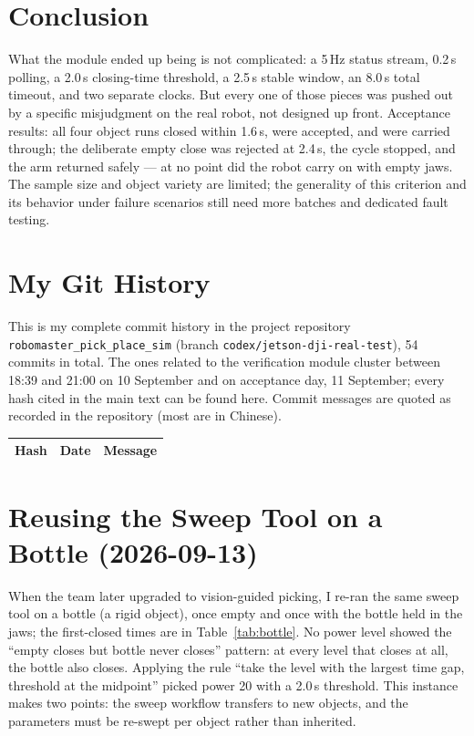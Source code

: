 \documentclass[11pt,a4paper]{ctexart}
\begin{document}
\section{Conclusion}

What the module ended up being is not complicated: a 5\,Hz status stream,
0.2\,s polling, a 2.0\,s closing-time threshold, a 2.5\,s stable window, an
8.0\,s total timeout, and two separate clocks. But every one of those pieces
was pushed out by a specific misjudgment on the real robot, not designed up
front. Acceptance results: all four object runs closed within 1.6\,s, were
accepted, and were carried through; the deliberate empty close was rejected
at 2.4\,s, the cycle stopped, and the arm returned safely --- at no point did
the robot carry on with empty jaws. The sample size and object variety are
limited; the generality of this criterion and its behavior under failure
scenarios still need more batches and dedicated fault testing.

\appendix
\section{My Git History}
This is my complete commit history in the project repository
\texttt{robomaster\_pick\_place\_sim} (branch
\texttt{codex/jetson-dji-real-test}), 54 commits in total. The ones related
to the verification module cluster between 18:39 and 21:00 on 10 September
and on acceptance day, 11 September; every hash cited in the main text can be
found here. Commit messages are quoted as recorded in the repository (most
are in Chinese).

\begin{center}
\footnotesize
\begin{longtable}{p{2.2cm}p{2.2cm}p{10.4cm}}
\toprule
Hash & Date & Message \\
\midrule
\endhead

\end{longtable}
\end{center}

\section{Reusing the Sweep Tool on a Bottle (2026-09-13)}
When the team later upgraded to vision-guided picking, I re-ran the same
sweep tool on a bottle (a rigid object), once empty and once with the bottle
held in the jaws; the first-closed times are in Table~\ref{tab:bottle}. No
power level showed the ``empty closes but bottle never closes'' pattern: at
every level that closes at all, the bottle also closes. Applying the rule
``take the level with the largest time gap, threshold at the midpoint''
picked power 20 with a 2.0\,s threshold. This instance makes two points: the
sweep workflow transfers to new objects, and the parameters must be re-swept
per object rather than inherited.
\end{document}
